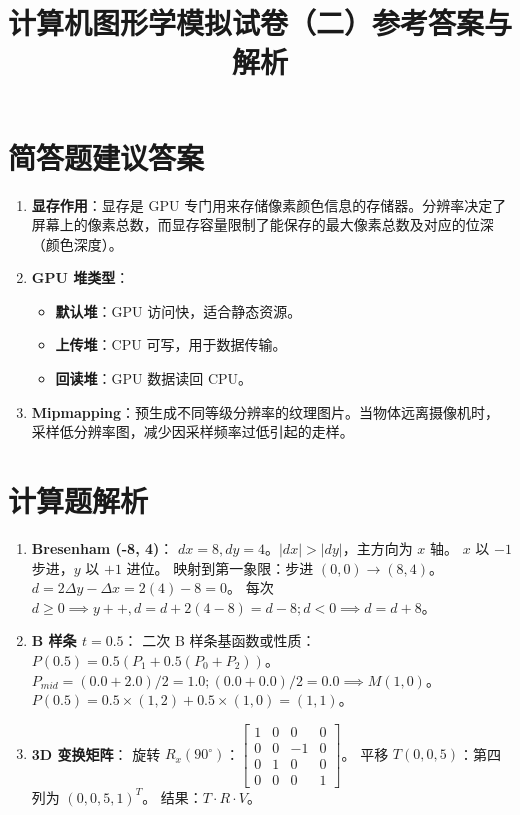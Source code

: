 \documentclass[UTF8]{ctexart}
\title{计算机图形学模拟试卷（二）参考答案与解析}
\date{}
\begin{document}
\maketitle

\section{简答题建议答案}
\begin{enumerate}
    \item \textbf{显存作用}：显存是 GPU 专门用来存储像素颜色信息的存储器。分辨率决定了屏幕上的像素总数，而显存容量限制了能保存的最大像素总数及对应的位深（颜色深度）。
    \item \textbf{GPU 堆类型}：
    \begin{itemize}
        \item \textbf{默认堆}：GPU 访问快，适合静态资源。
        \item \textbf{上传堆}：CPU 可写，用于数据传输。
        \item \textbf{回读堆}：GPU 数据读回 CPU。
    \end{itemize}
    \item \textbf{Mipmapping}：预生成不同等级分辨率的纹理图片。当物体远离摄像机时，采样低分辨率图，减少因采样频率过低引起的走样。
\end{enumerate}

\section{计算题解析}
\begin{enumerate}
    \item \textbf{Bresenham (-8, 4)}：
    $dx=8, dy=4$。$|dx| > |dy|$，主方向为 $x$ 轴。
    $x$ 以 $-1$ 步进，$y$ 以 $+1$ 进位。
    映射到第一象限：步进 $(0,0) \to (8,4)$。
    $d = 2\Delta y - \Delta x = 2(4) - 8 = 0$。
    每次 $d \ge 0 \implies y++, d = d + 2(4-8) = d-8; d < 0 \implies d = d+8$。
    
    \item \textbf{B 样条 $t=0.5$}：
    二次 B 样条基函数或性质：$P(0.5) = 0.5(P_1 + 0.5(P_0 + P_2))$。
    $P_{mid} = (0.0+2.0)/2 = 1.0; (0.0+0.0)/2 = 0.0 \implies M(1,0)$。
    $P(0.5) = 0.5 \times (1,2) + 0.5 \times (1,0) = (1, 1)$。
    
    \item \textbf{3D 变换矩阵}：
    旋转 $R_x(90^\circ)$：$\begin{bmatrix} 1&0&0&0 \\ 0&0&-1&0 \\ 0&1&0&0 \\ 0&0&0&1 \end{bmatrix}$。
    平移 $T(0,0,5)$：第四列为 $(0,0,5,1)^T$。
    结果：$T \cdot R \cdot V$。
\end{enumerate}
\end{document}
